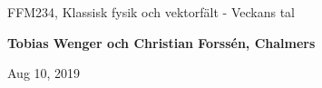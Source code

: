 \documentclass[%
oneside,                 %
final,                   %
10pt]{article}
\begin{document}

\newcommand{\exercisesection}[1]{\subsection*{#1}}







\thispagestyle{empty}

\begin{center}
{\LARGE\bf
\begin{spacing}{1.25}
FFM234, Klassisk fysik och vektorfält - Veckans tal
\end{spacing}
}
\end{center}


\begin{center}
{\bf Tobias Wenger och Christian Forssén, Chalmers${}^{}$} \\ [0mm]
\end{center}

\begin{center}
\end{center}
    

\begin{center}
Aug 10, 2019
\end{center}

\vspace{1cm}
\end{document}

